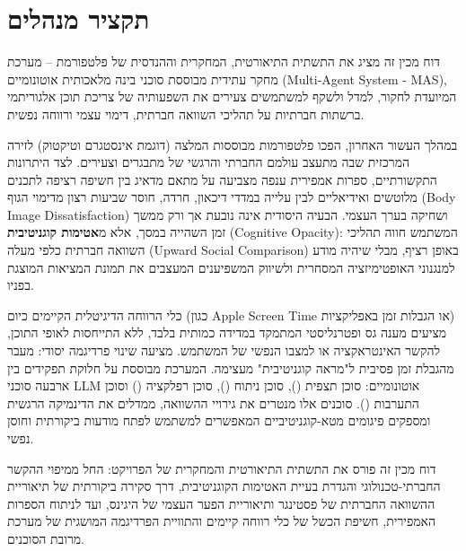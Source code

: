 
\chapter*{תקציר מנהלים}

דוח מכין זה מציג את התשתית התיאורטית, המחקרית וההנדסית של פלטפורמת \projectname{} -- מערכת מחקר עתידית מבוססת סוכני בינה מלאכותית אוטונומיים (\textenglish{Multi-Agent System - MAS}), המיועדת לחקור, למדל ולשקף למשתמשים צעירים את השפעותיה של צריכת תוכן אלגוריתמי ברשתות חברתיות על תהליכי השוואה חברתית, דימוי עצמי ורווחה נפשית.

במהלך העשור האחרון, הפכו פלטפורמות מבוססות המלצה (דוגמת אינסטגרם וטיקטוק) לזירה המרכזית שבה מתעצב עולמם החברתי והרגשי של מתבגרים וצעירים. לצד היתרונות התקשורתיים, ספרות אמפירית ענפה מצביעה על מתאם מדאיג בין חשיפה רציפה לתכנים מלוטשים ואידיאליים לבין עלייה במדדי דיכאון, חרדה, חוסר שביעות רצון מדימוי הגוף (\textenglish{Body Image Dissatisfaction}) ושחיקה בערך העצמי. הבעיה היסודית אינה נובעת אך ורק ממשך זמן השהייה במסך, אלא מ\textbf{אטימות קוגניטיבית} (\textenglish{Cognitive Opacity}): המשתמש חווה תהליכי השוואה חברתית כלפי מעלה (\textenglish{Upward Social Comparison}) באופן רציף, מבלי שיהיה מודע למנגנוני האופטימיזציה המסחרית ולשיווק המשפיענים המעצבים את תמונת המציאות המוצגת בפניו.

כלי הרווחה הדיגיטלית הקיימים כיום (כגון \textenglish{Apple Screen Time} או הגבלות זמן באפליקציות) מציעים מענה גס ופטרנליסטי המתמקד במדידה כמותית בלבד, ללא התייחסות לאופי התוכן, להקשר האינטראקציה או למצבו הנפשי של המשתמש. \projectname{} מציעה שינוי פרדיגמה יסודי: מעבר מהגבלת זמן פסיבית ל"מראה קוגניטיבית" מעצימה. המערכת מבוססת על חלוקת תפקידים בין ארבעה סוכני \textenglish{LLM} אוטונומיים: סוכן תצפית (\agentObserver{}), סוכן ניתוח (\agentAnalyst{}), סוכן רפלקציה (\agentReflector{}) וסוכן התערבות (\agentInterventionist{}). סוכנים אלו מנטרים את גירויי ההשוואה, ממדלים את הדינמיקה הרגשית ומספקים פיגומים מטא-קוגניטיביים המאפשרים למשתמש לפתח מודעות ביקורתית וחוסן נפשי.

דוח מכין זה פורס את התשתית התיאורטית והמחקרית של הפרויקט: החל ממיפוי ההקשר החברתי-טכנולוגי והגדרת בעיית האטימות הקוגניטיבית, דרך סקירה ביקורתית של תיאוריית ההשוואה החברתית של פסטינגר ותיאוריית הפער העצמי של היגינס, ועד לניתוח הספרות האמפירית, חשיפת הכשל של כלי רווחה קיימים והתוויית הפרדיגמה המושגית של מערכת מרובת הסוכנים.

